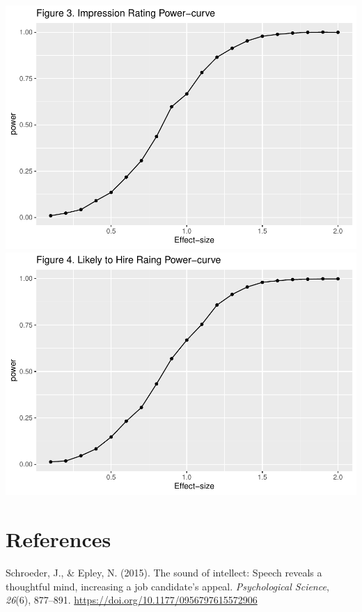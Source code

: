 \documentclass[
  english,
  man]{apa6}
\begin{document}
\includegraphics{APAreport_files/figure-latex/unnamed-chunk-4-1.pdf} \includegraphics{APAreport_files/figure-latex/unnamed-chunk-4-2.pdf}

\newpage

\hypertarget{references}{%
\section{References}\label{references}}

\begingroup
\setlength{\parindent}{-0.5in}
\setlength{\leftskip}{0.5in}

\hypertarget{refs}{}
\leavevmode\hypertarget{ref-schroeder_sound_2015}{}%
Schroeder, J., \& Epley, N. (2015). The sound of intellect: Speech reveals a thoughtful mind, increasing a job candidate's appeal. \emph{Psychological Science}, \emph{26}(6), 877--891. \url{https://doi.org/10.1177/0956797615572906}

\endgroup
\end{document}
